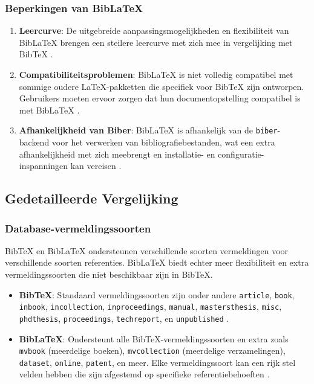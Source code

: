 \subsubsection{Beperkingen van BibLaTeX}
\begin{enumerate}
    \item \textbf{Leercurve}: De uitgebreide aanpassingsmogelijkheden en flexibiliteit van BibLaTeX brengen een steilere leercurve met zich mee in vergelijking met BibTeX \autocite{Kime2024}.
    \item \textbf{Compatibiliteitsproblemen}: BibLaTeX is niet volledig compatibel met sommige oudere \LaTeX{}-pakketten die specifiek voor BibTeX zijn ontworpen. Gebruikers moeten ervoor zorgen dat hun documentopstelling compatibel is met BibLaTeX \autocite{Kime2024}.
    \item \textbf{Afhankelijkheid van Biber}: BibLaTeX is afhankelijk van de \texttt{biber}-backend voor het verwerken van bibliografiebestanden, wat een extra afhankelijkheid met zich meebrengt en installatie- en configuratie-inspanningen kan vereisen \autocite{Kime2024}.
\end{enumerate}

\subsection{Gedetailleerde Vergelijking}

\subsubsection{Database-vermeldingssoorten}
BibTeX en BibLaTeX ondersteunen verschillende soorten vermeldingen voor verschillende soorten referenties. BibLaTeX biedt echter meer flexibiliteit en extra vermeldingssoorten die niet beschikbaar zijn in BibTeX.

\begin{itemize}
    \item \textbf{BibTeX}: Standaard vermeldingssoorten zijn onder andere \texttt{article}, \texttt{book}, \texttt{inbook}, \texttt{incollection}, \texttt{inproceedings}, \texttt{manual}, \texttt{mastersthesis}, \texttt{misc}, \texttt{phdthesis}, \texttt{proceedings}, \texttt{techreport}, en \texttt{unpublished} \autocite{Patashnik1988}.
    \item \textbf{BibLaTeX}: Ondersteunt alle BibTeX-vermeldingssoorten en extra zoals \texttt{mvbook} (meerdelige boeken), \texttt{mvcollection} (meerdelige verzamelingen), \texttt{dataset}, \texttt{online}, \texttt{patent}, en meer. Elke vermeldingssoort kan een rijk stel velden hebben die zijn afgestemd op specifieke referentiebehoeften \autocite{Kime2024}.
\end{itemize}

